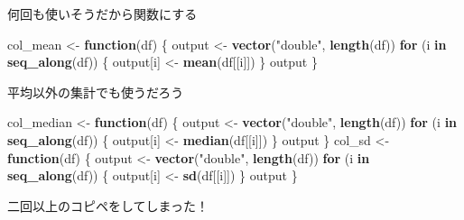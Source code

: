 \documentclass[ignorenonframetext,]{beamer}
\newenvironment{Shaded}{\begin{snugshade}}{\end{snugshade}}
\newcommand{\KeywordTok}[1]{\textcolor[rgb]{0.13,0.29,0.53}{\textbf{#1}}}
\newcommand{\StringTok}[1]{\textcolor[rgb]{0.31,0.60,0.02}{#1}}
\newcommand{\ControlFlowTok}[1]{\textcolor[rgb]{0.13,0.29,0.53}{\textbf{#1}}}
\newcommand{\NormalTok}[1]{#1}
\begin{document}
\begin{frame}[fragile]{何回も使いそうだから関数にする}

\begin{Shaded}
\begin{Highlighting}[]
\NormalTok{col_mean <-}\StringTok{ }\ControlFlowTok{function}\NormalTok{(df) \{}
\NormalTok{    output <-}\StringTok{ }\KeywordTok{vector}\NormalTok{(}\StringTok{"double"}\NormalTok{, }\KeywordTok{length}\NormalTok{(df))}
  \ControlFlowTok{for}\NormalTok{ (i }\ControlFlowTok{in} \KeywordTok{seq_along}\NormalTok{(df)) \{}
\NormalTok{        output[i] <-}\StringTok{ }\KeywordTok{mean}\NormalTok{(df[[i]])}
\NormalTok{    \}}
\NormalTok{    output}
\NormalTok{\}}
\end{Highlighting}
\end{Shaded}

\end{frame}

\begin{frame}[fragile]{平均以外の集計でも使うだろう}

\begin{Shaded}
\begin{Highlighting}[]
\NormalTok{col_median <-}\StringTok{ }\ControlFlowTok{function}\NormalTok{(df) \{}
\NormalTok{    output <-}\StringTok{ }\KeywordTok{vector}\NormalTok{(}\StringTok{"double"}\NormalTok{, }\KeywordTok{length}\NormalTok{(df))}
  \ControlFlowTok{for}\NormalTok{ (i }\ControlFlowTok{in} \KeywordTok{seq_along}\NormalTok{(df)) \{}
\NormalTok{        output[i] <-}\StringTok{ }\KeywordTok{median}\NormalTok{(df[[i]])}
\NormalTok{    \}}
\NormalTok{    output}
\NormalTok{\}}
\NormalTok{col_sd <-}\StringTok{ }\ControlFlowTok{function}\NormalTok{(df) \{}
\NormalTok{    output <-}\StringTok{ }\KeywordTok{vector}\NormalTok{(}\StringTok{"double"}\NormalTok{, }\KeywordTok{length}\NormalTok{(df))}
  \ControlFlowTok{for}\NormalTok{ (i }\ControlFlowTok{in} \KeywordTok{seq_along}\NormalTok{(df)) \{}
\NormalTok{        output[i] <-}\StringTok{ }\KeywordTok{sd}\NormalTok{(df[[i]])}
\NormalTok{    \}}
\NormalTok{    output}
\NormalTok{\}}
\end{Highlighting}
\end{Shaded}

二回以上のコピペをしてしまった！

\end{frame}
\end{document}
